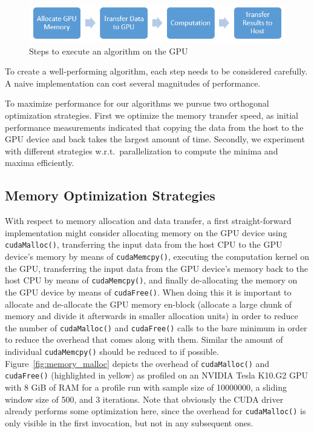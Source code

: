 \begin{figure} [h]
    \centering
    \includegraphics[width=0.8\linewidth]{Figures/steps}
    \caption{Steps to execute an algorithm on the GPU\label{fig:steps}}
\end{figure}

To create a well-performing algorithm, each step needs to be considered carefully. A naive implementation can cost several magnitudes of performance.

To maximize performance for our algorithms we pursue two orthogonal optimization strategies. First we optimize the memory transfer speed, as initial performance measurements indicated that copying the data from the host to the GPU device and back takes the largest amount of time. Secondly, we experiment with different strategies w.r.t.\ parallelization to compute the minima and maxima efficiently. 

\subsection{Memory Optimization Strategies}
\label{ch:memory optimization}

With respect to memory allocation and data transfer, a first straight-forward implementation might consider allocating memory on the GPU device using \texttt{cudaMalloc()}, transferring the input data from the host CPU to the GPU device's memory by means of \texttt{cudaMemcpy()}, executing the computation kernel on the GPU, transferring the input data from the GPU device's memory back to the host CPU by means of \texttt{cudaMemcpy()}, and finally de-allocating the memory on the GPU device by means of \texttt{cudaFree()}.
When doing this it is important to allocate and de-allocate the GPU memory en-block (allocate a large chunk of memory and divide it afterwards in smaller allocation units) in order to reduce the number of \texttt{cudaMalloc()} and \texttt{cudaFree()} calls to the bare minimum in order to reduce the overhead that comes along with them. Similar the amount of individual \texttt{cudaMemcpy()} should be reduced to if possible. Figure~\ref{fig:memory_malloc} depicts the overhead of \texttt{cudaMalloc()} and \texttt{cudaFree()} (highlighted in yellow) as profiled on an NVIDIA Tesla K10.G2 GPU with 8 GiB of RAM for a profile run with sample size of 10000000, a sliding window size of 500, and 3 iterations. Note that obviously the CUDA driver already performs some optimization here, since the overhead for \texttt{cudaMalloc()} is only visible in the first invocation, but not in any subsequent ones.


